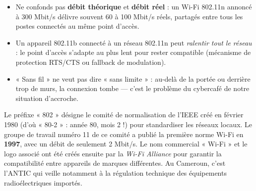 \documentclass[11pt]{article}
\begin{document}
\begin{attention}
\begin{itemize}
\item Ne confonds pas \textbf{débit théorique} et \textbf{débit réel} : un Wi-Fi 802.11n annoncé à 300 Mbit/s délivre souvent 60 à 100 Mbit/s réels, partagés entre tous les postes connectés au même point d'accès.
\item Un appareil 802.11b connecté à un réseau 802.11n peut \emph{ralentir tout le réseau} : le point d'accès s'adapte au plus lent pour rester compatible (mécanisme de protection RTS/CTS ou fallback de modulation).
\item « Sans fil » ne veut pas dire « sans limite » : au-delà de la portée ou derrière trop de murs, la connexion tombe — c'est le problème du cybercafé de notre situation d'accroche.
\end{itemize}
\end{attention}

\begin{savaistu}
Le préfixe « 802 » désigne le comité de normalisation de l'IEEE créé en février 1980 (d'où « 80-2 » : année 80, mois 2 !) pour standardiser les réseaux locaux. Le groupe de travail numéro 11 de ce comité a publié la première norme Wi-Fi en \textbf{1997}, avec un débit de seulement 2 Mbit/s. Le nom commercial « Wi-Fi » et le logo associé ont été créés ensuite par la \emph{Wi-Fi Alliance} pour garantir la compatibilité entre appareils de marques différentes. Au Cameroun, c'est l'ANTIC qui veille notamment à la régulation technique des équipements radioélectriques importés.
\end{savaistu}
\end{document}
